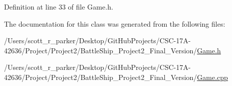 Definition at line 33 of file Game.\+h.



The documentation for this class was generated from the following files\+:\begin{DoxyCompactItemize}
\item 
/\+Users/scott\+\_\+r\+\_\+parker/\+Desktop/\+Git\+Hub\+Projects/\+C\+S\+C-\/17\+A-\/42636/\+Project/\+Project2/\+Battle\+Ship\+\_\+\+Project2\+\_\+\+Final\+\_\+\+Version/\hyperlink{_game_8h}{Game.\+h}\item 
/\+Users/scott\+\_\+r\+\_\+parker/\+Desktop/\+Git\+Hub\+Projects/\+C\+S\+C-\/17\+A-\/42636/\+Project/\+Project2/\+Battle\+Ship\+\_\+\+Project2\+\_\+\+Final\+\_\+\+Version/\hyperlink{_game_8cpp}{Game.\+cpp}\end{DoxyCompactItemize}
